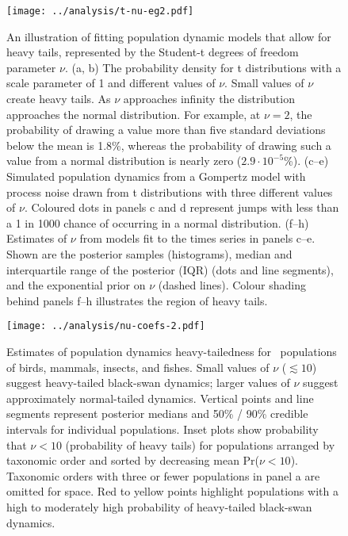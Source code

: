 \begin{figure}[htbp]
\begin{center}
\texttt{[image: ../analysis/t-nu-eg2.pdf]}
\caption{
An illustration of fitting population dynamic models that allow for heavy
tails, represented by the Student-t degrees of freedom parameter $\nu$. (a, b)
The probability density for t distributions with a scale parameter of 1 and
different values of $\nu$. Small values of $\nu$ create heavy tails. As $\nu$
approaches infinity the distribution approaches the normal distribution. For
example, at $\nu = 2$, the probability of drawing a value more than five
standard deviations below the mean is 1.8\%, whereas the probability of drawing
such a value from a normal distribution is nearly zero ($2.9\cdot10^{-5}$\%).
(c--e) Simulated population dynamics from a Gompertz model with process noise
drawn from t distributions with three different values of $\nu$. Coloured dots
in panels c and d represent jumps with less than a 1 in 1000 chance of
occurring in a normal distribution. (f--h) Estimates of $\nu$ from models fit
to the times series in panels c--e. Shown are the posterior samples
(histograms), median and interquartile range of the posterior (IQR) (dots and
line segments), and the exponential prior on $\nu$ (dashed lines). Colour
shading behind panels f--h illustrates the region of heavy tails.
}
\label{fig:didactic}
\end{center}
\end{figure}

\clearpage

\begin{figure}[htbp]
\begin{center}
\texttt{[image: ../analysis/nu-coefs-2.pdf]}

\caption{Estimates of population dynamics heavy-tailedness for \nuCoefPopN\
  populations of birds, mammals, insects, and fishes. Small values of $\nu$
  ($\lesssim 10$) suggest heavy-tailed black-swan dynamics; larger values of
  $\nu$ suggest approximately normal-tailed dynamics. Vertical points and line
  segments represent posterior medians and 50\% / 90\% credible intervals for
  individual populations. Inset plots show probability that $\nu < 10$
  (probability of heavy tails) for populations arranged by taxonomic order and
  sorted by decreasing mean Pr($\nu < 10$). Taxonomic orders with three or
  fewer populations in panel a are omitted for space. Red to yellow points
  highlight populations with a high to moderately high probability of
  heavy-tailed black-swan dynamics.}

\label{fig:nu-coefs}
\end{center}
\end{figure}
\clearpage

